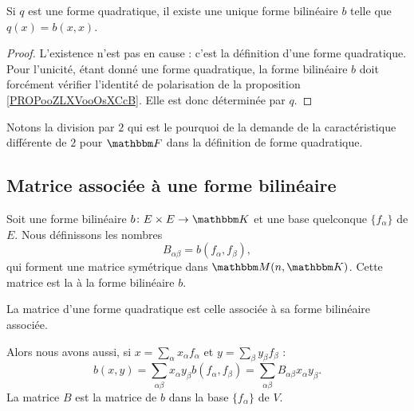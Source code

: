 \begin{lemma}       \label{LEMooLKNTooSfLSHt}
    Si \( q\) est une forme quadratique, il existe une unique forme bilinéaire \( b\) telle que \( q(x)=b(x,x)\).
\end{lemma}

\begin{proof}
    L'existence n'est pas en cause : c'est la définition d'une forme quadratique. Pour l'unicité, étant donné une forme quadratique, la forme bilinéaire \( b\) doit forcément vérifier l'identité de polarisation de la proposition \ref{PROPooZLXVooOsXCcB}. Elle est donc déterminée par \( q\).
\end{proof}
Notons la division par \( 2\) qui est le pourquoi de la demande de la caractéristique différente de \( 2\) pour \( \eF\) dans la définition de forme quadratique.

\subsection{Matrice associée à une forme bilinéaire}
 
\begin{definition}      \label{DEFooAOGPooXWXUcN}
    Soit une forme bilinéaire \( b\colon E\times E\to \eK\) et une base quelconque \( \{ f_{\alpha} \}\) de \( E\). Nous définissons les nombres
    \begin{equation}    \label{EQooCUGFooRlKUtu}
        B_{\alpha\beta}=b(f_{\alpha},f_{\beta}),
    \end{equation}
    qui forment une matrice symétrique dans \( \eM(n,\eK)\). Cette matrice est la  à la forme bilinéaire \( b\).

    La matrice d'une forme quadratique est celle associée à sa forme bilinéaire associée.
\end{definition}

Alors nous avons aussi, si \( x=\sum_{\alpha}x_{\alpha}f_{\alpha}\) et \( y=\sum_{\beta}y_{\beta}f_{\beta}\) :
  \begin{equation}        \label{EQooQFMWooVKVLMx}
    b(x,y)=\sum_{\alpha\beta}x_{\alpha}y_{\beta}b(f_{\alpha},f_{\beta})=\sum_{\alpha\beta}B_{\alpha\beta}x_{\alpha}y_{\beta}.
  \end{equation}
  La matrice \( B\) est la matrice de \( b\) dans la base \( \{ f_{\alpha} \}\) de \( V\).
  
